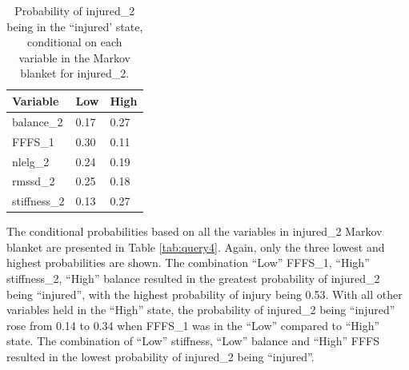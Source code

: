 \documentclass[man,floatsintext]{apa6}
\begin{document}
\begin{table}[H]

\begin{center}
\begin{threeparttable}

\caption{\label{tab:query3}Probability of injured\_2 being in the ``injured' state, conditional on each variable in the Markov blanket for injured\_2.}

\begin{tabular}{lll}
\toprule
Variable & Low & High\\
\midrule
balance\_2 & 0.17 & 0.27\\
FFFS\_1 & 0.30 & 0.11\\
nlelg\_2 & 0.24 & 0.19\\
rmssd\_2 & 0.25 & 0.18\\
stiffness\_2 & 0.13 & 0.27\\
\bottomrule
\end{tabular}

\end{threeparttable}
\end{center}

\end{table}

The conditional probabilities based on all the variables in injured\_2 Markov blanket are presented in Table \ref{tab:query4}.
Again, only the three lowest and highest probabilities are shown.
The combination \enquote{Low} FFFS\_1, \enquote{High} stiffness\_2, \enquote{High} balance resulted in the greatest probability of injured\_2 being \enquote{injured}, with the highest probability of injury being 0.53.
With all other variables held in the \enquote{High} state, the probability of injured\_2 being \enquote{injured} rose from 0.14 to 0.34 when FFFS\_1 was in the \enquote{Low} compared to \enquote{High} state.
The combination of \enquote{Low} stiffness, \enquote{Low} balance and \enquote{High} FFFS resulted in the lowest probability of injured\_2 being \enquote{injured}.
\end{document}
